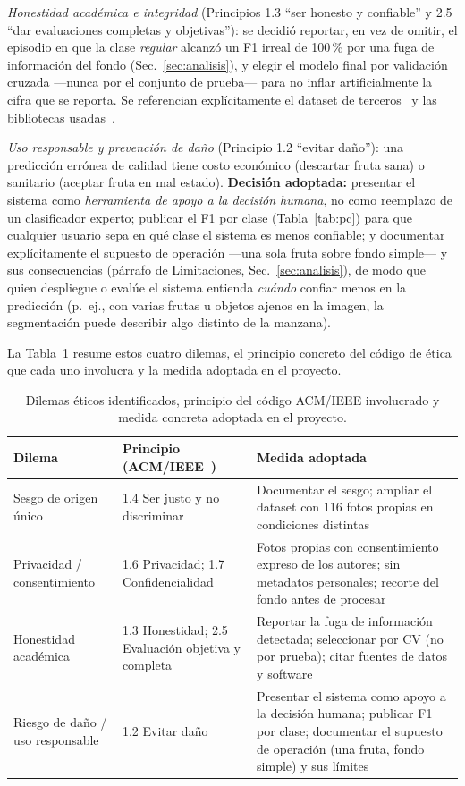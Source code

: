 \documentclass[conference]{IEEEtran}
\begin{document}
\emph{Honestidad académica e integridad} (Principios 1.3 ``ser honesto y
confiable'' y 2.5 ``dar evaluaciones completas y objetivas''): se decidió
reportar, en vez de omitir, el episodio en que la clase \emph{regular} alcanzó
un F1 irreal de 100\,\% por una fuga de información del fondo
(Sec.~\ref{sec:analisis}), y elegir el modelo final por validación cruzada
—nunca por el conjunto de prueba— para no inflar artificialmente la cifra que
se reporta. Se referencian explícitamente el dataset de
terceros~\cite{kaggle} y las bibliotecas usadas~\cite{scikit}.

\emph{Uso responsable y prevención de daño} (Principio 1.2 ``evitar daño''):
una predicción errónea de calidad tiene costo económico (descartar fruta sana)
o sanitario (aceptar fruta en mal estado). \textbf{Decisión adoptada:}
presentar el sistema como \emph{herramienta de apoyo a la decisión humana}, no
como reemplazo de un clasificador experto; publicar el F1 por clase
(Tabla~\ref{tab:pc}) para que cualquier usuario sepa en qué clase el sistema es
menos confiable; y documentar explícitamente el supuesto de operación —una
sola fruta sobre fondo simple— y sus consecuencias (párrafo de Limitaciones,
Sec.~\ref{sec:analisis}),
de modo que quien despliegue o evalúe el sistema entienda \emph{cuándo} confiar
menos en la predicción (p.\ ej., con varias frutas u objetos ajenos en la
imagen, la segmentación puede describir algo distinto de la manzana).

La Tabla~\ref{tab:etica} resume estos cuatro dilemas, el principio concreto del
código de ética que cada uno involucra y la medida adoptada en el proyecto.

\begin{table}[t]
\caption{Dilemas éticos identificados, principio del código ACM/IEEE
involucrado y medida concreta adoptada en el proyecto.}
\label{tab:etica}
\centering
\begin{tabular}{p{1.7cm}p{2.6cm}p{3.1cm}}
\toprule
Dilema & Principio (ACM/IEEE~\cite{acm}) & Medida adoptada \\
\midrule
Sesgo de origen único & 1.4 Ser justo y no discriminar & Documentar el sesgo;
ampliar el dataset con 116 fotos propias en condiciones distintas \\
Privacidad / consentimiento & 1.6 Privacidad; 1.7 Confidencialidad &
Fotos propias con consentimiento expreso de los autores; sin metadatos
personales; recorte del fondo antes de procesar \\
Honestidad académica & 1.3 Honestidad; 2.5 Evaluación objetiva y completa &
Reportar la fuga de información detectada; seleccionar por CV (no por prueba);
citar fuentes de datos y software \\
Riesgo de daño / uso responsable & 1.2 Evitar daño & Presentar el sistema como
apoyo a la decisión humana; publicar F1 por clase; documentar el supuesto de
operación (una fruta, fondo simple) y sus límites \\
\bottomrule
\end{tabular}
\end{table}
\end{document}
